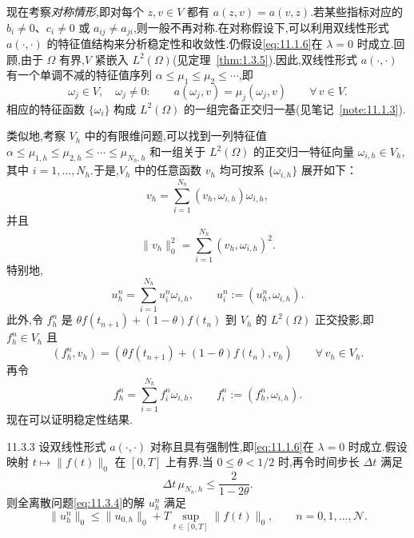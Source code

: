 现在考察\emph{对称情形},即对每个 \(z,v\in V\) 都有 \(a(z,v)=a(v,z)\).若某些指标对应的 \(b_i\ne0\)、\(c_i\ne0\) 或 \(a_{ij}\ne a_{ji}\),则一般不再对称.在对称假设下,可以利用双线性形式 \(a(\cdot,\cdot)\) 的特征值结构来分析稳定性和收敛性.仍假设\eqref{eq:11.1.6}在 \(\lambda=0\) 时成立.回顾,由于 \(\Omega\) 有界,\(V\) 紧嵌入 \(L^2(\Omega)\)(见定理~\ref{thm:1.3.5}).因此,双线性形式 \(a(\cdot,\cdot)\) 有一个单调不减的特征值序列 \(\alpha\le\mu_1\le\mu_2\le\cdots\),即
\begin{equation}\label{eq:11.3.18}
  \omega_j\in V,\quad\omega_j\ne0:\qquad
       a(\omega_j,v)=\mu_j(\omega_j,v)\qquad\forall\,v\in V.
\end{equation}
相应的特征函数 \(\{\omega_i\}\) 构成 \(L^2(\Omega)\) 的一组完备正交归一基(见笔记~\ref{note:11.1.3}).

类似地,考察 \(V_h\) 中的有限维问题,可以找到一列特征值 \(\alpha\le\mu_{1,h}\le\mu_{2,h}\le\cdots\le\mu_{N_h,h}\) 和一组关于 \(L^2(\Omega)\) 的正交归一特征向量 \(\omega_{i,h}\in V_h\),其中 \(i=1,\ldots,N_h\).于是,\(V_h\) 中的任意函数 \(v_h\) 均可按系 \(\{\omega_{i,h}\}\) 展开如下：
\begin{equation}\label{eq:11.3.19}
  v_h=\sum_{i=1}^{N_h}(v_h,\omega_{i,h})\omega_{i,h},
\end{equation}
并且
\[
  \|v_h\|_0^2=\sum_{i=1}^{N_h}(v_h,\omega_{i,h})^2.
\]
特别地,
\begin{equation}\label{eq:11.3.20}
  u_h^n=\sum_{i=1}^{N_h}u_i^n\omega_{i,h},\qquad u_i^n:=(u_h^n,\omega_{i,h}).
\end{equation}
此外,令 \(f_h^n\) 是 \(\theta f(t_{n+1})+(1-\theta)f(t_n)\) 到 \(V_h\) 的 \(L^2(\Omega)\) 正交投影,即 \(f_h^n\in V_h\) 且
\begin{equation}\label{eq:11.3.21}
  (f_h^n,v_h)=(\theta f(t_{n+1})+(1-\theta)f(t_n),v_h)
          \qquad\forall\,v_h\in V_h.
\end{equation}
再令
\begin{equation}\label{eq:11.3.22}
  f_h^n=\sum_{i=1}^{N_h}f_i^n\omega_{i,h},\qquad f_i^n:=(f_h^n,\omega_{i,h}).
\end{equation}
现在可以证明稳定性结果.

\begin{theorem}[稳定性]{11.3.3}
设双线性形式 \(a(\cdot,\cdot)\) 对称且具有强制性,即\eqref{eq:11.1.6}在 \(\lambda=0\) 时成立.假设映射 \(t\mapsto\|f(t)\|_0\) 在 \([0,T]\) 上有界.当 \(0\le\theta<1/2\) 时,再令时间步长 \(\Delta t\) 满足
\begin{equation}\label{eq:11.3.23}
  \Delta t\,\mu_{N_h,h}\le\frac2{1-2\theta}.
\end{equation}
则全离散问题\eqref{eq:11.3.4}的解 \(u_h^n\) 满足
\begin{equation}\label{eq:11.3.24}
  \|u_h^n\|_0\le\|u_{0,h}\|_0+T\sup_{t\in[0,T]}\|f(t)\|_0,\qquad n=0,1,\ldots,\mathcal N.
\end{equation}
\end{theorem}

